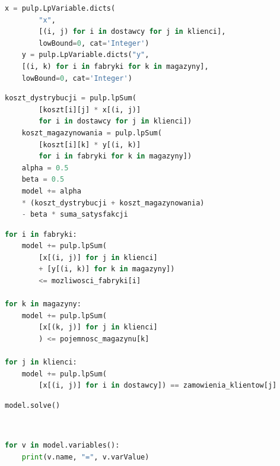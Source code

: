 \begin{lstlisting}[language=Python, caption={Zmienne decyzyjne}]
    x = pulp.LpVariable.dicts(
        "x",
        [(i, j) for i in dostawcy for j in klienci],
        lowBound=0, cat='Integer')
    y = pulp.LpVariable.dicts("y",
    [(i, k) for i in fabryki for k in magazyny],
    lowBound=0, cat='Integer')
\end{lstlisting}

\begin{lstlisting}[language=Python, caption={Funkcje celu}]
    koszt_dystrybucji = pulp.lpSum(
        [koszt[i][j] * x[(i, j)]
        for i in dostawcy for j in klienci])
    koszt_magazynowania = pulp.lpSum(
        [koszt[i][k] * y[(i, k)]
        for i in fabryki for k in magazyny])
    alpha = 0.5
    beta = 0.5
    model += alpha
    * (koszt_dystrybucji + koszt_magazynowania)
    - beta * suma_satysfakcji
\end{lstlisting}

\begin{lstlisting}[language=Python, caption={Ograniczenia}]
for i in fabryki:
    model += pulp.lpSum(
        [x[(i, j)] for j in klienci]
        + [y[(i, k)] for k in magazyny])
        <= mozliwosci_fabryki[i]

for k in magazyny:
    model += pulp.lpSum(
        [x[(k, j)] for j in klienci]
        ) <= pojemnosc_magazynu[k]

for j in klienci:
    model += pulp.lpSum(
        [x[(i, j)] for i in dostawcy]) == zamowienia_klientow[j]
\end{lstlisting}

\begin{lstlisting}[language=Python, caption={Rozwiązanie problemu}]
    model.solve()
\end{lstlisting}
\

\begin{lstlisting}[language=Python, caption={Przedstawienie wyników}]
for v in model.variables():
    print(v.name, "=", v.varValue)
\end{lstlisting}

